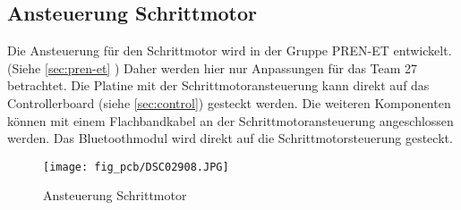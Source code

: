 \subsection{Ansteuerung Schrittmotor}
\label{sec:stepperdriver}
Die Ansteuerung für den Schrittmotor wird in der Gruppe PREN-ET entwickelt. 
(Siehe \ref{sec:pren-et} ) 
Daher werden hier nur Anpassungen für das Team 27 betrachtet. 
Die Platine mit der Schrittmotoransteuerung kann direkt auf das 
Controllerboard (siehe \ref{sec:control}) gesteckt werden.  Die weiteren 
Komponenten können mit einem Flachbandkabel an der Schrittmotoransteuerung 
angeschlossen werden. Das Bluetoothmodul wird direkt auf die 
Schrittmotorsteuerung gesteckt. 
\begin{figure}[h!]
    \centering
    \texttt{[image: fig\_pcb/DSC02908.JPG]}
    \caption{Ansteuerung Schrittmotor}
    \label{fig:dc}
\end{figure}

